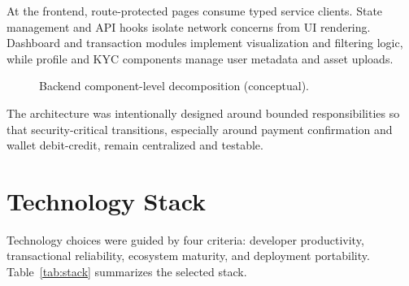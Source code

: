 \documentclass[conference]{IEEEtran}
\begin{document}
At the frontend, route-protected pages consume typed service clients. State management and API hooks isolate network concerns from UI rendering. Dashboard and transaction modules implement visualization and filtering logic, while profile and KYC components manage user metadata and asset uploads.

\begin{figure}[t]
\centering
{}
\caption{Backend component-level decomposition (conceptual).}
\label{fig:component_arch}
\end{figure}

The architecture was intentionally designed around bounded responsibilities so that security-critical transitions, especially around payment confirmation and wallet debit-credit, remain centralized and testable.

\section{Technology Stack}
Technology choices were guided by four criteria: developer productivity, transactional reliability, ecosystem maturity, and deployment portability. Table~\ref{tab:stack} summarizes the selected stack.
\end{document}
